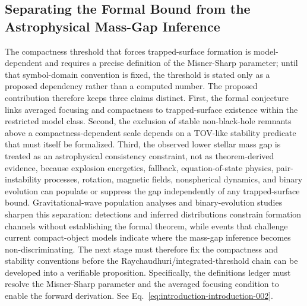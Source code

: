 \documentclass[conference]{IEEEtran}
\begin{document}
\subsection{Separating the Formal Bound from the Astrophysical Mass-Gap Inference}
The compactness threshold that forces trapped-surface formation is model-dependent and requires a precise definition of the Misner-Sharp parameter; until that symbol-domain convention is fixed, the threshold is stated only as a proposed dependency rather than a computed number. The proposed contribution therefore keeps three claims distinct. First, the formal conjecture links averaged focusing and compactness to trapped-surface existence within the restricted model class. Second, the exclusion of stable non-black-hole remnants above a compactness-dependent scale depends on a TOV-like stability predicate that must itself be formalized. Third, the observed lower stellar mass gap is treated as an astrophysical consistency constraint, not as theorem-derived evidence, because explosion energetics, fallback, equation-of-state physics, pair-instability processes, rotation, magnetic fields, nonspherical dynamics, and binary evolution can populate or suppress the gap independently of any trapped-surface bound. Gravitational-wave population analyses and binary-evolution studies sharpen this separation: detections and inferred distributions constrain formation channels without establishing the formal theorem, while events that challenge current compact-object models indicate where the mass-gap inference becomes non-discriminating. The next stage must therefore fix the compactness and stability conventions before the Raychaudhuri/integrated-threshold chain can be developed into a verifiable proposition. Specifically, the definitions ledger must resolve the Misner-Sharp parameter and the averaged focusing condition to enable the forward derivation. See Eq.~\eqref{eq:introduction-introduction-002}.~\cite{cite_72d7ff391b29c495,cite_c369df652181e8f7,cite_7a407c865faafd11,cite_fd0f77b2a173c0ab,cite_977568cf7b8a55bf,cite_07d6df5d6978a1fc,cite_f634820e22d7a238,cite_cbbced417410bc6c,cite_42e341ff6471ce89,cite_7a44e6730c44cb39}
\end{document}
